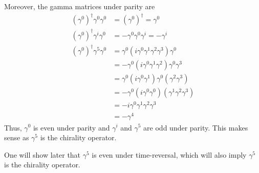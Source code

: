 \documentclass[12pt,a4paper,titlepage]{article}
\begin{document}
Moreover, the gamma matrices under parity are
\begin{equation}
\begin{aligned}
(\gamma^{0})^{\dagger}\gamma^{0}\gamma^{0}&=(\gamma^{0})^{\dagger}=\gamma^{0}\\
(\gamma^{0})^{\dagger}\gamma^{i}\gamma^{0}&=-\gamma^{0}\gamma^{0}\gamma^{i}=-\gamma^{i}\\
(\gamma^{0})^{\dagger}\gamma^{5}\gamma^{0}&=\gamma^{0}(i\gamma^{0}\gamma^{1}\gamma^{2}\gamma^{3})\gamma^{0}\\
&=-\gamma^{0}(i\gamma^{0}\gamma^{1}\gamma^{2})\gamma^{0}\gamma^{3}\\
&=\gamma^{0}(i\gamma^{0}\gamma^{1})\gamma^{0}(\gamma^{2}\gamma^{3})\\
&=-\gamma^{0}(i\gamma^{0}\gamma^{0})(\gamma^{1}\gamma^{2}\gamma^{3})\\
&=-i\gamma^{0}\gamma^{1}\gamma^{2}\gamma^{3}\\
&=-\gamma^{4}
\end{aligned}
\end{equation}
Thus, $\gamma^{0}$ is even under parity and $\gamma^{i}$ and $\gamma^{5}$ are odd under parity. This makes sense as $\gamma^{5}$ is the chirality operator.
\begin{center}
\end{center}
One will show later that $\gamma^{5}$ is even under time-reversal, which will also imply $\gamma^{5}$ is the chirality operator.
\end{document}

